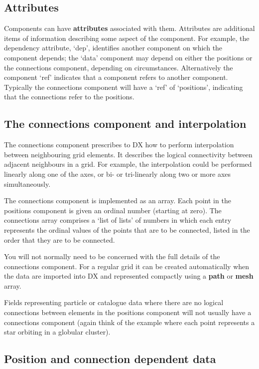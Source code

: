 \subsection{Attributes}

Components can have {\bf attributes} associated with them. Attributes
are additional items of information describing some aspect of the
component. For example, the dependency attribute, `dep', identifies
another component on which the component depends; the `data' component
may depend on either the positions or the connections component, depending
on circumstances. Alternatively the component `ref' indicates that a
component refers to another component. Typically the connections
component will have a `ref' of `positions', indicating that the
connections refer to the positions.

\subsection{\label{CONINT}The connections component and interpolation}


The connections component prescribes to DX how to perform interpolation
between neighbouring grid elements. It describes the logical
connectivity between adjacent neighbours in a grid. For example, the
interpolation could be performed linearly along one of the axes, or
bi- or tri-linearly along two or more axes simultaneously.

The connections component is implemented as an array. Each point in the
positions component is given an ordinal number (starting at zero). The
connections array comprises a `list of lists' of numbers in which each
entry represents the ordinal values of the points that are to be
connected, listed in the order that they are to be connected.

You will not normally need to be concerned with the full details of the
connections component. For a regular grid it can be created
automatically when the data are imported into DX and represented
compactly using a {\bf path} or {\bf mesh} array.

Fields representing particle or catalogue data where there are no
logical connections between elements in the positions component will
not usually have a connections component (again think of the example
where each point represents a star orbiting in a globular cluster).

\subsection{\label{POSCONDEP}Position and connection dependent data}


